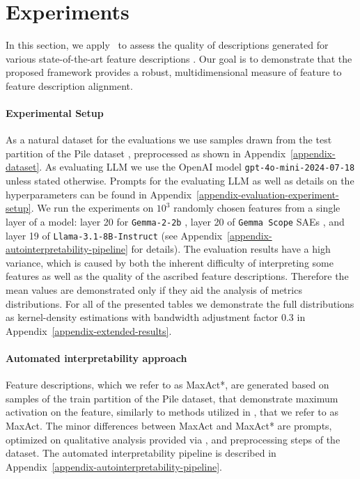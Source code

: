 

\section{Experiments}

In this section, we apply \ours\ to assess the quality of descriptions generated for various state-of-the-art feature descriptions \cite{choi2024automatic, lieberum-etal-2024-gemma}. Our goal is to demonstrate that the proposed framework provides a robust, multidimensional measure of feature to feature description alignment.

\paragraph{Experimental Setup}
As a natural dataset for the evaluations we use samples drawn from the test partition of the Pile dataset \cite{gao2020pile}, preprocessed as shown in 
Appendix~\ref{appendix-dataset}.
As evaluating LLM we use the OpenAI model \texttt{gpt-4o-mini-2024-07-18} unless stated otherwise. Prompts for the evaluating LLM as well as details on the hyperparameters can be found in Appendix~\ref{appendix-evaluation-experiment-setup}. We run the experiments on $10^3$ randomly chosen features from a single layer of a model: layer 20 for \texttt{Gemma-2-2b} \cite{gemmateam2024gemma2improvingopen}, layer 20 of \texttt{Gemma Scope} SAEs \cite{lieberum-etal-2024-gemma}, and layer 19 of \texttt{Llama-3.1-8B-Instruct} \cite{grattafiori2024llama3herdmodels} (see Appendix~\ref{appendix-autointerpretability-pipeline} for details). 
The evaluation results have a high variance, which is caused by both the inherent difficulty of interpreting some features as well as the quality of the ascribed feature descriptions. 
Therefore the mean values are demonstrated only if they aid the analysis of metrics distributions. For all of the presented tables we demonstrate the full distributions as kernel-density estimations with bandwidth adjustment factor 0.3 in Appendix~\ref{appendix-extended-results}. 

\paragraph{Automated interpretability approach}
Feature descriptions, which we refer to as MaxAct*, are generated based on samples of the train partition of the Pile dataset, that demonstrate maximum activation on the feature, similarly to methods utilized in \cite{bills2023language, paulo2024automaticallyinterpretingmillionsfeatures, rajamanoharan2024jumpingaheadimprovingreconstruction}, that we refer to as MaxAct. The minor differences between MaxAct and MaxAct* are prompts, optimized on qualitative analysis provided via \ours, and preprocessing steps of the dataset. The automated interpretability pipeline is described in Appendix~\ref{appendix-autointerpretability-pipeline}.


